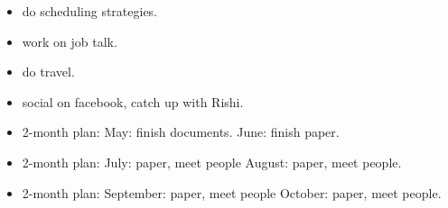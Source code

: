 \begin{minipage}{0.5\textwidth}
\begin{itemize}
\tiny \item \tiny do scheduling strategies.
\item \tiny work on job talk.
\item \tiny do travel.
\item \tiny social on facebook, catch up with Rishi.
\end{itemize}
\begin{itemize}
\item \tiny 2-month plan: May: finish documents.  June:  finish paper.
\item \tiny 2-month plan: July: paper, meet people  August: paper, meet people.
\item \tiny 2-month plan: September: paper, meet people  October:
  paper, meet people.
\end{itemize}
\end{minipage}

